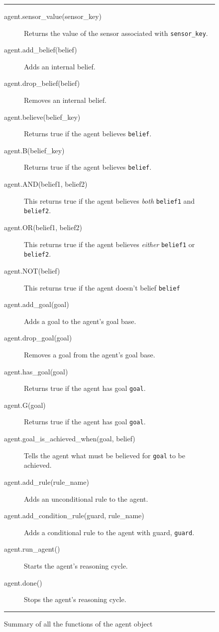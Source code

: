 \documentclass[a4,12pt]{article}
\begin{document}
\begin{figure}[htbp]
  \hrule
  \begin{description}
\item[agent.sensor\_value(sensor\_key)] Returns the value of the sensor associated with \lstinline{sensor_key}.
\item[agent.add\_belief(belief)] Adds an internal belief.
\item[agent.drop\_belief(belief)] Removes an internal belief.
  \item[agent.believe(belief\_key)] Returns true if the agent believes \lstinline{belief}.
  \item[agent.B(belief\_key)] Returns true if the agent believes \lstinline{belief}.
  \item[agent.AND(belief1, belief2)] This returns true if the agent believes \emph{both} \lstinline{belief1} and \lstinline{belief2}.
  \item[agent.OR(belief1, belief2)] This returns true if the agent believes \emph{either} \lstinline{belief1} or \lstinline{belief2}.
  \item[agent.NOT(belief)] This returns true if the agent doesn't belief \lstinline{belief}
 \item[agent.add\_goal(goal)] Adds a goal to the agent's goal base.
 \item[agent.drop\_goal(goal)] Removes a goal from the agent's goal base.
 \item[agent.has\_goal(goal)] Returns true if the agent has goal \lstinline{goal}.
 \item[agent.G(goal)] Returns true if the agent has goal \lstinline{goal}.
 \item[agent.goal\_is\_achieved\_when(goal, belief)] Tells the agent what must be believed for \lstinline{goal} to be achieved.
 \item[agent.add\_rule(rule\_name)] Adds an unconditional rule to the agent.
 \item[agent.add\_condition\_rule(guard, rule\_name)] Adds a conditional rule to the agent with guard, \lstinline{guard}.
 \item[agent.run\_agent()] Starts the agent's reasoning cycle.
 \item[agent.done()] Stops the agent's reasoning cycle.
  \end{description}
  \hrule
  \caption{Summary of all the functions of the agent object}
  \label{fig:agent_functions}
\end{figure}
\end{document}
